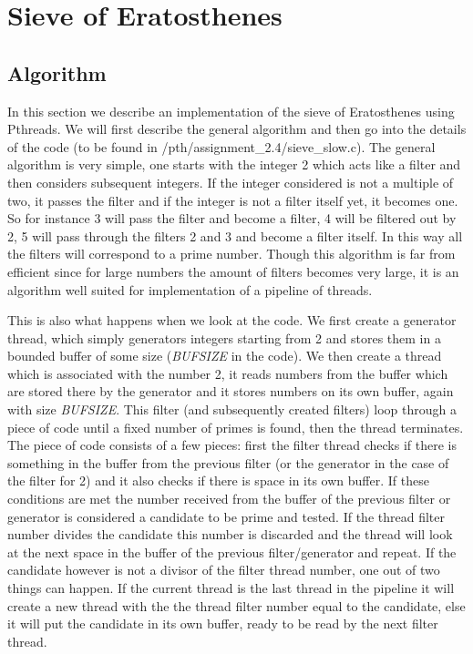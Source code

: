 \documentclass[11pt,a4paper,onecolumn]{article}
\begin{document}
\section{Sieve of Eratosthenes}
\subsection{Algorithm}
In this section we describe an implementation of the sieve of Eratosthenes using Pthreads. We will first describe the general algorithm and then go into the details of the code (to be found in /pth/assignment\_2.4/sieve\_slow.c). The general algorithm is very simple, one starts with the integer 2 which acts like a filter and then considers subsequent integers. If the integer considered is not a multiple of two, it passes the filter and if the integer is not a filter itself yet, it becomes one. So for instance 3 will pass the filter and become a filter, 4 will be filtered out by 2, 5 will pass through the filters 2 and 3 and become a filter itself. In this way all the filters will correspond to a prime number. Though this algorithm is far from efficient since for large numbers the amount of filters becomes very large, it is an algorithm well suited for implementation of a pipeline of threads.

This is also what happens when we look at the code. We first create a generator thread, which simply generators integers starting from 2 and stores them in a bounded buffer of some size (\emph{BUFSIZE} in the code). We then create a thread which is associated with the number 2, it reads numbers from the buffer which are stored there by the generator and it stores numbers on its own buffer, again with size \emph{BUFSIZE}. This filter (and subsequently created filters) loop through a piece of code until a fixed number of primes is found, then the thread terminates. The piece of code consists of a few pieces: first the filter thread checks if there is something in the buffer from the previous filter (or the generator in the case of the filter for 2) and it also checks if there is space in its own buffer. If these conditions are met the number received from the buffer of the previous filter or generator is considered a candidate to be prime and tested. If the thread filter number divides the candidate this number is discarded and the thread will look at the next space in the buffer of the previous filter/generator and repeat. If the candidate however is not a divisor of the filter thread number, one out of two things can happen. If the current thread is the last thread in the pipeline it will create a new thread with the the thread filter number equal to the candidate, else it will put the candidate in its own buffer, ready to be read by the next filter thread.
\end{document}
